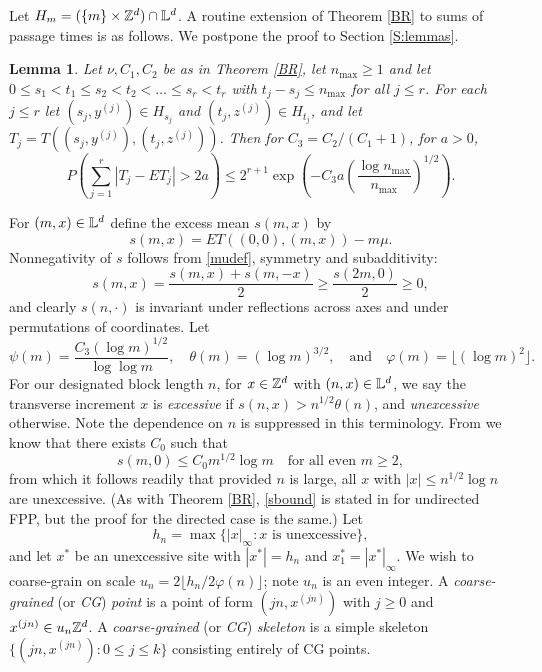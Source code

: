 \documentclass[12pt]{amsart}
\theoremstyle{plain}
\newtheorem{lemma}{Lemma}[section]
\theoremstyle{definition}
\numberwithin{equation}{section}
\begin{document}
Let $H_m=(\{m\} \times \mathbb{Z}^d) \cap \mathbb{L}^d$.
A routine extension of Theorem \ref{BR} to sums of passage times is as follows.  We postpone the proof to Section \ref{S:lemmas}.

\begin{lemma} \label{sums}
Let $\nu,C_1,C_2$ be as in Theorem \ref{BR}, let $n_{\max} \geq 1$ and let $0 \leq s_1<t_1 \leq s_2 < t_2 < \dots \leq s_r < t_r$ with $t_j-s_j \leq n_{\max}$ for all $j \leq r$.  For each $j \leq r$ let $(s_j,y^{(j)}) \in H_{s_j}$ and $(t_j,z^{(j)}) \in H_{t_j}$, and let $T_j = T((s_j,y^{(j)}),(t_j,z^{(j)}))$.  Then for $C_3=C_2/(C_1+1)$, for $a>0$,
\begin{equation}
  P\left( \sum_{j=1}^r |T_j - ET_j| > 2a\right) \leq 2^{r+1} \exp\left( -C_3a\left( \frac{\log n_{\max}}{n_{\max}} \right)^{1/2} \right).
  \end{equation}
\end{lemma}

For $(m,x) \in \mathbb{L}^d$ define the excess mean $s(m,x)$ by
\[
  s(m,x) = ET((0,0),(m,x)) - m\mu.
  \]
Nonnegativity of $s$ follows from \eqref{mudef}, symmetry and subadditivity:  
\[
  s(m,x) = \frac{s(m,x) + s(m,-x)}{2} \geq \frac{s(2m,0)}{2} \geq 0,
  \]
and clearly $s(n,\cdot)$ is invariant under reflections across axes and under permutations of coordinates.  Let
\begin{equation} \label{slowlyvar}
  \psi(m) = \frac{C_3(\log m)^{1/2}}{\log \log m}, \quad \theta(m) = (\log m)^{3/2}, \quad \text{and} \quad \varphi(m) = \lfloor (\log m)^2 \rfloor.
  \end{equation}
For our designated block length $n$, for $x \in \mathbb{Z}^d$ with $(n,x) \in \mathbb{L}^d$, we say the transverse increment $x$ is \emph{excessive} if $s(n,x) > n^{1/2}\theta(n)$, and \emph{unexcessive} otherwise.  Note the dependence on $n$ is suppressed in this terminology.  From \cite{Al93} we know that there exists $C_0$ such that
\begin{equation} \label{sbound}
  s(m,0) \leq C_0m^{1/2}\log m \quad \text{for all even } m \geq 2,
  \end{equation}
from which it follows readily that provided $n$ is large, all $x$ with $|x| \leq n^{1/2}\log n$ are unexcessive.  (As with Theorem \ref{BR}, \eqref{sbound} is stated in \cite{Al93} for undirected FPP, but the proof for the directed case is the same.)  Let
\[
  h_n = \max\{|x|_\infty: x \text{ is unexcessive}\},
  \]
and let $x^*$ be an unexcessive site with $|x^*|=h_n$ and $x_1^* = |x^*|_\infty$.  We wish to coarse-grain on scale $u_n = 2\lfloor h_n/2\varphi(n) \rfloor$; note $u_n$ is an even integer.
A \emph{coarse-grained} (or \emph{CG}) \emph{point} is a point of form $(jn,x^{(jn)})$ with $j \geq 0$ and $x^{(jn)} \in u_n\mathbb{Z}^d$.
A \emph{coarse-grained} (or \emph{CG}) \emph{skeleton} is a simple skeleton $\{(jn,x^{(jn)}):0 \leq j \leq k\}$ consisting entirely of CG points.  
  
\end{document}

